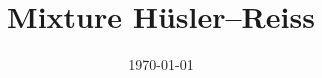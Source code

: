 \documentclass[
]{article}
\title{Mixture Hüsler--Reiss}
\author{}
\date{\vspace{-2.5em}\today}
\begin{document}
\maketitle

\newcommand{\GP}{\operatorname{GP}}  
\newcommand{\Gumbel}{\operatorname{Gumbel}}  
\newcommand{\supp}{\operatorname{supp}} 
\newcommand{\MEV}{\operatorname{MEV}}

\newcommand\myeq{\stackrel{\mathclap{\normalfont\mbox{a.s}}}{=}}

\newcommand{\expec}{\operatorname{E}}

\newcommand{\indep}{\perp \!\!\! \perp}
\newcommand{\Mb}{\mathcal{M}_{b}}
\newcommand{\Cb}{\mathcal{C}_{b}}
\newcommand{\Co}{\mathcal{C}_{0}}
\newcommand{\Mo}{\mathcal{M}_{0}}
\newcommand{\normun}{\|\,\cdot\,\|_1}
\newcommand{\norminfty}{\|\,\cdot\,\|_{\infty}}
\newcommand{\norm}{\|\,\cdot\,\|}
\newcommand{\GEV}{\operatorname{GEV}}
\newcommand{\diag}{\operatorname{diag}}
\newcommand{\indicator}{\operatorname{\mathbbm{1}}}
\newcommand{\DA}{\operatorname{DA}} 
\newcommand{\ninf}[1]{\left\|{#1}\right\|_{\infty}}
\newcommand{\cone}{\mathcal{C}}
\newcommand{\point}{\,\cdot\,}
\newcommand{\UIj}{\boldsymbol{U}_{\mid I_j}}
\newcommand{\TIj}{\boldsymbol{T}_{\mid I_j}}
\newcommand{\Fr}{\operatorname{Fr}}   
\newcommand{\tg}{\operatorname{tg}} 
\newcommand{\stdf}{\operatorname{stdf}}
\newcommand{\card}{\operatorname{Card}}

\newcommand{\RR}{\mathbb{R}} 
\newcommand{\bo}[1]{\boldsymbol{#1}} 
\newcommand{\diff}{\, \textnormal{d}} 
\newcommand{\eqd}{\overset{\textnormal{d}}{=}} 
\newcommand{\dto}{\overset{\textnormal{d}}{\rightarrow}}

\newcommand{\vX}{\vc{X}} 
\newcommand{\vx}{\vc{x}}
\newcommand{\eps}{\epsilon}
\newcommand{\borel}{\mathcal{B}}
\newcommand{\sphere}{\mathbb{S}}

\newcommand{\Ea}{\mathbb{E}_I}
\newcommand{\Eb}{\mathbb{E}_{I,r,\|\, \cdot\,\|}}
\newcommand{\Ec}{ \mathbb{S}_{\|\, \cdot\,\|}}
\newcommand{\Ed}{\mathbb{S}_{I, \|\, \cdot\,\|}}
\newcommand{\itemQ}{%
    \addtocounter{Qx}{1}
    \item[Q\theQx.]}
\newcommand{\am}[1]{\textcolor{red}{\small\sffamily [#1]}}
\end{document}
